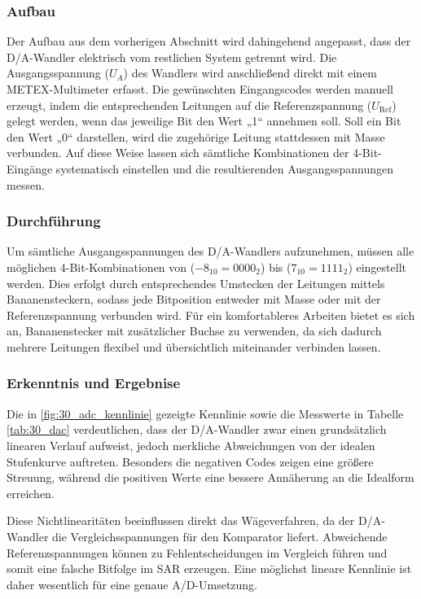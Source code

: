 \subsubsection{Aufbau}
Der Aufbau aus dem vorherigen Abschnitt wird dahingehend angepasst, dass der D/A-Wandler elektrisch vom restlichen System getrennt wird. Die Ausgangsspannung ($U_A$) des Wandlers wird anschließend direkt mit einem METEX-Multimeter erfasst. Die gewünschten Eingangscodes werden manuell erzeugt, indem die entsprechenden Leitungen auf die Referenzspannung ($U_\text{Ref}$) gelegt werden, wenn das jeweilige Bit den Wert „1“ annehmen soll. Soll ein Bit den Wert „0“ darstellen, wird die zugehörige Leitung stattdessen mit Masse verbunden. Auf diese Weise lassen sich sämtliche Kombinationen der 4-Bit-Eingänge systematisch einstellen und die resultierenden Ausgangsspannungen messen.

\subsubsection{Durchführung}
Um sämtliche Ausgangsspannungen des D/A-Wandlers aufzunehmen, müssen alle möglichen 4-Bit-Kombinationen von ($-8_{10} = 0000_2$) bis ($7_{10} = 1111_2$) eingestellt werden. Dies erfolgt durch entsprechendes Umstecken der Leitungen mittels Bananensteckern, sodass jede Bitposition entweder mit Masse oder mit der Referenzspannung verbunden wird. Für ein komfortableres Arbeiten bietet es sich an, Bananenstecker mit zusätzlicher Buchse zu verwenden, da sich dadurch mehrere Leitungen flexibel und übersichtlich miteinander verbinden lassen.

\subsubsection{Erkenntnis und Ergebnise}
Die in \autoref{fig:30_adc_kennlinie} gezeigte Kennlinie sowie die Messwerte in Tabelle \ref{tab:30_dac} verdeutlichen, dass der D/A-Wandler zwar einen grundsätzlich linearen Verlauf aufweist, jedoch merkliche Abweichungen von der idealen Stufenkurve auftreten. Besonders die negativen Codes zeigen eine größere Streuung, während die positiven Werte eine bessere Annäherung an die Idealform erreichen.

Diese Nichtlinearitäten beeinflussen direkt das Wägeverfahren, da der D/A-Wandler die Vergleichsspannungen für den Komparator liefert. Abweichende Referenzspannungen können zu Fehlentscheidungen im Vergleich führen und somit eine falsche Bitfolge im SAR erzeugen. Eine möglichst lineare Kennlinie ist daher wesentlich für eine genaue A/D-Umsetzung.

